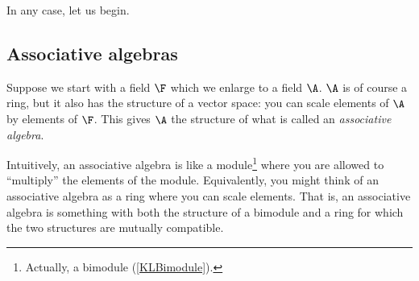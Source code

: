 In any case, let us begin.

\subsection{Associative algebras}

Suppose we start with a field $\F$ which we enlarge to a field $\A$.  $\A$ is of course a ring, but it also has the structure of a vector space:  you can scale elements of $\A$ by elements of $\F$.  This gives $\A$ the structure of what is called an \emph{associative algebra}.

Intuitively, an associative algebra is like a module\footnote{Actually, a bimodule (\cref{KLBimodule}).} where you are allowed to ``multiply'' the elements of the module.  Equivalently, you might think of an associative algebra as a ring where you can scale elements.  That is, an associative algebra is something with both the structure of a bimodule and a ring for which the two structures are mutually compatible.
